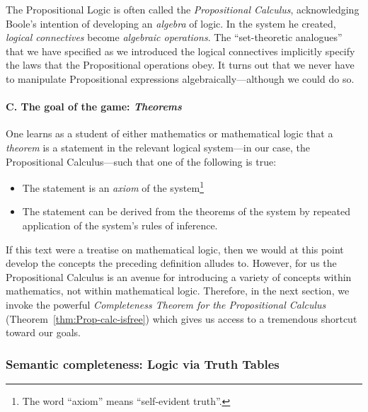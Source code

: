 
\medskip

The Propositional Logic is often called the {\it Propositional
  Calculus},  acknowledging Boole's
intention of developing an {\em algebra} of logic.  In the system he
created, {\em logical connectives} become {\em algebraic operations}.
The ``set-theoretic analogues'' that we have specified as we
introduced the logical connectives implicitly specify the laws that
the Propositional operations obey.  It turns out that we never have to
manipulate Propositional expressions algebraically---although we could
do so.

\bigskip

\paragraph{C. The goal of the game: {\em Theorems}}
One learns as a student of either mathematics or mathematical logic
that a {\it theorem} is a statement in the relevant logical
system---in our case, the Propositional Calculus---such that one of
the following is true:

\begin{itemize}
\item
The statement is an {\it axiom} of the system\footnote{The word ``axiom'' means ``self-evident truth''.}
\item
The statement can be derived from the theorems of the system by repeated
  application of the system's rules of inference.
\end{itemize}
If this text were a treatise on mathematical logic, then we would at
this point develop the concepts the preceding definition alludes to.
However, for us the Propositional Calculus is an avenue for
introducing a variety of concepts within mathematics, not within
mathematical logic.  Therefore, in the next section, we invoke the
powerful {\it Completeness Theorem for the Propositional Calculus}
(Theorem~\ref{thm:Prop-calc-isfree}) which gives us access to a
tremendous shortcut toward our goals.


\subsubsection{Semantic completeness: Logic via Truth Tables}
\label{sec:truth-tables}

